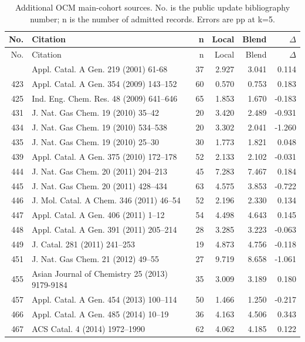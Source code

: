 \small\begin{longtable}{r p{.39\linewidth} rrrr}
\caption{Additional OCM main-cohort sources. No. is the public update bibliography number; n is the number of admitted records. Errors are pp at k=5.}\\
\toprule No. & Citation & n & Local & Blend & $\Delta$ \\ \midrule\endfirsthead
\toprule No. & Citation & n & Local & Blend & $\Delta$ \\ \midrule\endhead
\bottomrule\endfoot
422 & Appl. Catal. A Gen. 219 (2001) 61-68 & 37 & 2.927 & 3.041 & 0.114 \\
423 & Appl. Catal. A Gen. 354 (2009) 143--152 & 60 & 0.570 & 0.753 & 0.183 \\
425 & Ind. Eng. Chem. Res. 48 (2009) 641--646 & 65 & 1.853 & 1.670 & -0.183 \\
431 & J. Nat. Gas Chem. 19 (2010) 35--42 & 20 & 3.420 & 2.489 & -0.931 \\
434 & J. Nat. Gas Chem. 19 (2010) 534--538 & 20 & 3.302 & 2.041 & -1.260 \\
435 & J. Nat. Gas Chem. 19 (2010) 25--30 & 30 & 1.773 & 1.821 & 0.048 \\
439 & Appl. Catal. A Gen. 375 (2010) 172--178 & 52 & 2.133 & 2.102 & -0.031 \\
444 & J. Nat. Gas Chem. 20 (2011) 204--213 & 45 & 7.283 & 7.467 & 0.184 \\
445 & J. Nat. Gas Chem. 20 (2011) 428--434 & 63 & 4.575 & 3.853 & -0.722 \\
446 & J. Mol. Catal. A Chem. 346 (2011) 46--54 & 52 & 2.196 & 2.330 & 0.134 \\
447 & Appl. Catal. A Gen. 406 (2011) 1--12 & 54 & 4.498 & 4.643 & 0.145 \\
448 & Appl. Catal. A Gen. 391 (2011) 205--214 & 28 & 3.285 & 3.223 & -0.063 \\
449 & J. Catal. 281 (2011) 241--253 & 19 & 4.873 & 4.756 & -0.118 \\
451 & J. Nat. Gas Chem. 21 (2012) 49--55 & 27 & 9.719 & 8.658 & -1.061 \\
455 & Asian Journal of Chemistry 25 (2013) 9179-9184 & 35 & 3.009 & 3.189 & 0.180 \\
457 & Appl. Catal. A Gen. 454 (2013) 100--114 & 50 & 1.466 & 1.250 & -0.217 \\
466 & Appl. Catal. A Gen. 485 (2014) 10--19  & 36 & 4.163 & 4.506 & 0.343 \\
467 & ACS Catal. 4 (2014) 1972--1990 & 62 & 4.062 & 4.185 & 0.122 \\

\end{longtable}
